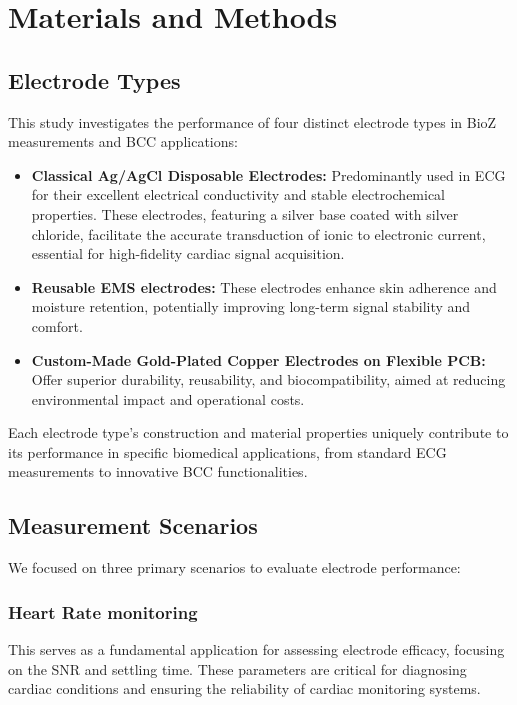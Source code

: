 \documentclass[conference]{IEEEtran}
\newcommand{\notea}[1]{\textcolor{blue}{Armands: #1}}
\begin{document}

%

\section{Materials and Methods}

\subsection{Electrode Types}
This study investigates the performance of four distinct electrode types in \gls{BioZ} measurements and \gls{BCC} applications:
\begin{itemize}
    \item \textbf{Classical Ag/AgCl Disposable Electrodes:} Predominantly used in \gls{ECG}  for their excellent electrical conductivity and stable electrochemical properties. These electrodes, featuring a silver base coated with silver chloride, facilitate the accurate transduction of ionic to electronic current, essential for high-fidelity cardiac signal acquisition.
    
    \item \textbf{Reusable \gls{EMS} electrodes:} These electrodes enhance skin adherence and moisture retention, potentially improving long-term signal stability and comfort.
    
    \item \textbf{Custom-Made Gold-Plated Copper Electrodes on Flexible \gls{PCB}:} Offer superior durability, reusability, and biocompatibility, aimed at reducing environmental impact and operational costs.
    
\end{itemize}

Each electrode type's construction and material properties uniquely contribute to its performance in specific biomedical applications, from standard \gls{ECG} measurements to innovative \gls{BCC} functionalities. 


\subsection{Measurement Scenarios}
We focused on three primary scenarios to evaluate electrode performance:

\subsubsection{Heart Rate monitoring}
This serves as a fundamental application for assessing electrode efficacy, focusing on the \gls{SNR} and settling time. These parameters are critical for diagnosing cardiac conditions and ensuring the reliability of cardiac monitoring systems.
\end{document}
